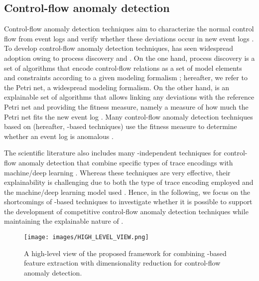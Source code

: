 \subsection{Control-flow anomaly detection}
Control-flow anomaly detection techniques aim to characterize the normal control flow from event logs and verify whether these deviations occur in new event logs \cite{ko2023adsystematicreview}. To develop control-flow anomaly detection techniques,  has seen widespread adoption owing to process discovery and . On the one hand, process discovery is a set of algorithms that encode control-flow relations as a set of model elements and constraints according to a given modeling formalism \cite{aalst2022pmhandbook}; hereafter, we refer to the Petri net, a widespread modeling formalism. On the other hand,  is an explainable set of algorithms that allows linking any deviations with the reference Petri net and providing the fitness measure, namely a measure of how much the Petri net fits the new event log \cite{aalst2022pmhandbook}. Many control-flow anomaly detection techniques based on  (hereafter, -based techniques) use the fitness measure to determine whether an event log is anomalous \cite{bezerra2009pmad, bezerra2013adlogspais, myers2018icsadpm, pecchia2020applicationfailuresanalysispm}. 

The scientific literature also includes many -independent techniques for control-flow anomaly detection that combine specific types of trace encodings with machine/deep learning \cite{ko2023adsystematicreview, tavares2023pmtraceencoding}. Whereas these techniques are very effective, their explainability is challenging due to both the type of trace encoding employed and the machine/deep learning model used \cite{rawal2022trustworthyaiadvances,li2023explainablead}. Hence, in the following, we focus on the shortcomings of -based techniques to investigate whether it is possible to support the development of competitive control-flow anomaly detection techniques while maintaining the explainable nature of .
\begin{figure}[!t]
\centering
\texttt{[image: images/HIGH\_LEVEL\_VIEW.png]}
\caption{A high-level view of the proposed framework for combining -based feature extraction with dimensionality reduction for control-flow anomaly detection.}
\label{HIGH_LEVEL_VIEW}
\end{figure}

